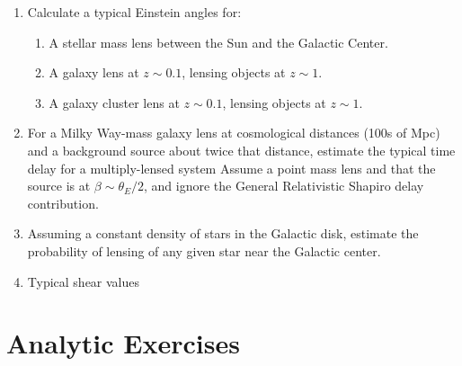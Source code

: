 \begin{enumerate} 
\item Calculate a typical Einstein angles for:
\begin{enumerate}
\item A stellar mass lens between the Sun and the Galactic Center.
\item A galaxy lens at $z\sim 0.1$, lensing objects at $z\sim 1$.
\item A galaxy cluster lens at $z\sim 0.1$, lensing objects at $z\sim
    1$.
\end{enumerate}
\item For a Milky Way-mass galaxy lens at cosmological distances (100s
    of Mpc) and a background source about twice that distance,
    estimate the typical time delay for a multiply-lensed system
    Assume a point mass lens and that the source is at
    $\beta\sim \theta_E/2$, and ignore the General Relativistic
    Shapiro delay contribution. 
\item Assuming a constant density of stars in the Galactic disk,
    estimate the probability of lensing of any given star near the
    Galactic center.
\item Typical shear values
\end{enumerate}   

\section{Analytic Exercises}

